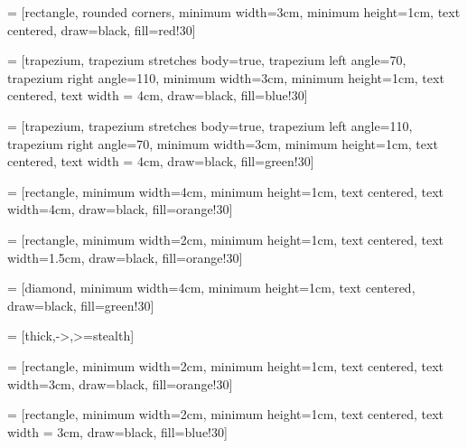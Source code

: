 \usepackage{tikz}
\usetikzlibrary{shapes.geometric, arrows, arrows.meta, positioning, calc, external}
\tikzexternalize[prefix=tikz/]

 = [rectangle, rounded corners,
minimum width=3cm,
minimum height=1cm,
text centered,
draw=black,
fill=red!30]

 = [trapezium,
trapezium stretches body=true, %
trapezium left angle=70,
trapezium right angle=110,
minimum width=3cm,
minimum height=1cm, text centered,
text width = 4cm,
draw=black, fill=blue!30]

 = [trapezium,
trapezium stretches body=true, %
trapezium left angle=110,
trapezium right angle=70,
minimum width=3cm,
minimum height=1cm, text centered,
text width = 4cm,
draw=black, fill=green!30]

 = [rectangle,
minimum width=4cm,
minimum height=1cm,
text centered,
text width=4cm,
draw=black,
fill=orange!30]

 = [rectangle,
minimum width=2cm,
minimum height=1cm,
text centered,
text width=1.5cm,
draw=black,
fill=orange!30]

 = [diamond,
minimum width=4cm,
minimum height=1cm,
text centered,
draw=black,
fill=green!30]

 = [thick,->,>=stealth]

 = [rectangle,
minimum width=2cm,
minimum height=1cm,
text centered,
text width=3cm,
draw=black,
fill=orange!30]

 = [rectangle,
minimum width=2cm,
minimum height=1cm,
text centered,
text width = 3cm,
draw=black, fill=blue!30]
